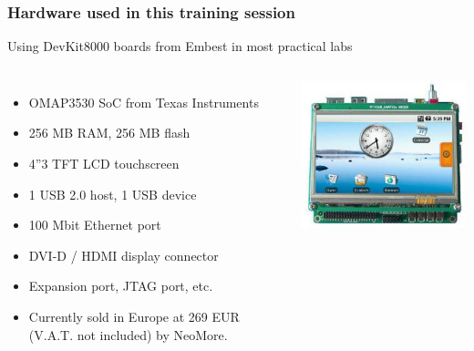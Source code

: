 \begin{frame}
\frametitle{Hardware used in this training session}
  Using DevKit8000 boards from Embest in most practical labs
  \begin{columns}
    \begin{itemize}
      \item OMAP3530 SoC from Texas Instruments
      \item 256 MB RAM, 256 MB flash
      \item 4”3  TFT LCD touchscreen
      \item 1 USB 2.0 host, 1 USB device
      \item 100 Mbit Ethernet port
      \item DVI-D / HDMI display connector
      \item Expansion port, JTAG port, etc.
      \item Currently sold in Europe at 269 EUR (V.A.T. not included)
            by NeoMore.
    \end{itemize}
    \includegraphics[width=\textwidth]{slides/devkit8000-board/devkit8000.jpg}
  \end{columns}
\end{frame}
